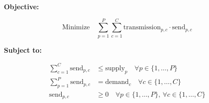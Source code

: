 \documentclass{article}
\begin{document}
\textbf{Objective:}

\[
\text{Minimize} \quad \sum_{p=1}^{P} \sum_{c=1}^{C} \text{transmission}_{p,c} \cdot \text{send}_{p,c}
\]

\textbf{Subject to:}

\begin{align*}
\sum_{c=1}^{C} \text{send}_{p,c} & \leq \text{supply}_{p} \quad \forall p \in \{1, \ldots, P\} \\
\sum_{p=1}^{P} \text{send}_{p,c} & = \text{demand}_{c} \quad \forall c \in \{1, \ldots, C\} \\
\text{send}_{p,c} & \geq 0 \quad \forall p \in \{1, \ldots, P\}, \, \forall c \in \{1, \ldots, C\}
\end{align*}
\end{document}
